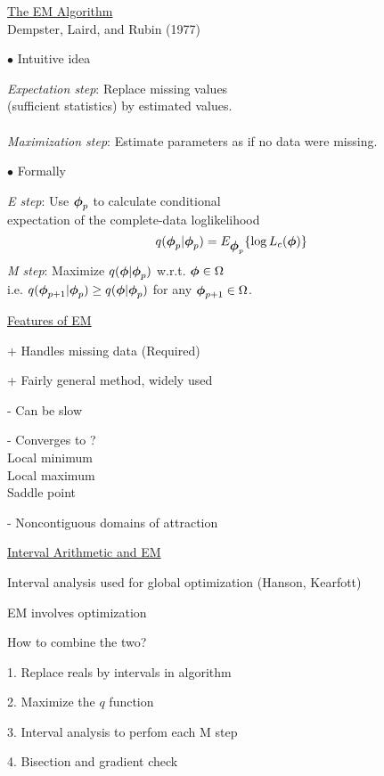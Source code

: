 \documentclass{slides}
\begin{document}
\begin{slide}
\begin{center}
\underline{The EM Algorithm}\\ Dempster, Laird, and Rubin (1977)
\end{center}

$\bullet$ Intuitive idea

{\it Expectation step}: Replace missing values \\
(sufficient statistics) by estimated values.\\
\\
{\it Maximization step}: Estimate parameters as if no data were missing.

$\bullet$ Formally

{\it E step}:  Use $\mbox{\boldmath $\phi$}_p$ to calculate conditional \\
expectation of the complete-data loglikelihood 
$$
q(\mbox{\boldmath $\phi$}_p | \mbox{\boldmath $\phi$}_p) = E_{\mbox{\boldmath $\phi$}_p} \{ \log L_c(\mbox{\boldmath $\phi$}) \}
$$
{\it M step}: Maximize $q(\mbox{\boldmath $\phi$} | \mbox{\boldmath $\phi$}_p)$ w.r.t. $\mbox{\boldmath $\phi$} \in
\Omega$\\
i.e. $q(\mbox{\boldmath $\phi$}_{p+1} | \mbox{\boldmath $\phi$}_p) \geq q(\mbox{\boldmath $\phi$} | \mbox{\boldmath $\phi$}_p)$ for any 
$\mbox{\boldmath $\phi$}_{p+1} \in \Omega$.
\end{slide}
\begin{slide}
\begin{center}
\underline{Features of EM}
\end{center}

+ Handles missing data (Required)

+ Fairly general method, widely used 

- Can be slow

- Converges to ?\\
\hspace*{.5in} Local minimum\\
\hspace*{.5in} Local maximum\\
\hspace*{.5in} Saddle point

- Noncontiguous domains of attraction 
\end{slide}
\begin{slide}
\begin{center}
\underline{Interval Arithmetic and EM}
\end{center}

Interval analysis used for global optimization (Hanson, Kearfott)

EM involves optimization

How to combine the two?

1. Replace reals by intervals in algorithm

2.  Maximize the $q$ function

3. Interval analysis to perfom each M step

4. Bisection and gradient check

\end{slide}
\end{document}
